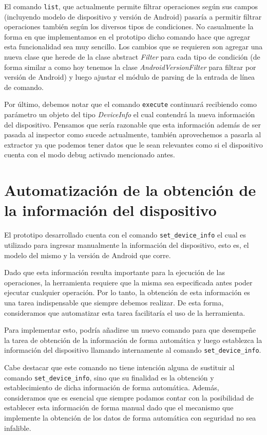El comando \texttt{list}, que actualmente permite filtrar operaciones según sus campos (incluyendo modelo de dispositivo y versión de Android) pasaría a permitir filtrar operaciones también según los diversos tipos de condiciones. No casualmente la forma en que implementamos en el prototipo dicho comando hace que agregar esta funcionalidad sea muy sencillo. Los cambios que se requieren son agregar una nueva clase que herede de la clase abstract \emph{Filter} para cada tipo de condición (de forma similar a como hoy tenemos la clase \emph{AndroidVersionFilter} para filtrar por versión de Android) y luego ajustar el módulo de parsing de la entrada de línea de comando.

Por último, debemos notar que el comando \texttt{execute} continuará recibiendo como parámetro un objeto del tipo \emph{DeviceInfo} el cual contendrá la nueva información del dispositivo. Pensamos que sería razonable que esta información además de ser pasada al inspector como sucede actualmente, también aprovechemos a pasarla al extractor ya que podemos tener datos que le sean relevantes como si el dispositivo cuenta con el modo debug activado mencionado antes.


\section{Automatización de la obtención de la información del dispositivo}
El prototipo desarrollado cuenta con el comando \texttt{set\_device\_info} el cual es utilizado para ingresar manualmente la información del dispositivo, esto es, el modelo del mismo y la versión de Android que corre.

Dado que esta información resulta importante para la ejecución de las operaciones, la herramienta requiere que la misma sea especificada antes poder ejecutar cualquier operación. Por lo tanto, la obtención de esta información es una tarea indispensable que siempre debemos realizar. De esta forma, consideramos que automatizar esta tarea facilitaría el uso de la herramienta.

Para implementar esto, podría añadirse un nuevo comando para que desempeñe la tarea de obtención de la información de forma automática y luego establezca la información del dispositivo llamando internamente al comando \texttt{set\_device\_info}.

Cabe destacar que este comando no tiene intención alguna de sustituir al comando \texttt{set\_device\_info}, sino que su finalidad es la obtención y establecimiento de dicha información de forma automática. Además, consideramos que es esencial que siempre podamos contar con la posibilidad de establecer esta información de forma manual dado que el mecanismo que implemente la obtención de los datos de forma automática con seguridad no sea infalible.

